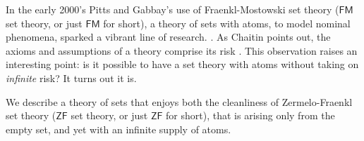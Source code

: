 \documentclass[12pt]{llncs}
\begin{document}
\lstset{language=[Objective]Caml,frame=shadowbox}




In the early 2000's Pitts and Gabbay's use of Fraenkl-Mostowski set
theory ($\mathsf{FM}$ set theory, or just $\mathsf{FM}$ for short), a
theory of sets with atoms, to model nominal phenomena, sparked a
vibrant line of research. \cite{DBLP:journals/fac/GabbayP02}
\cite{DBLP:journals/jcss/Clouston14}. As Chaitin points out, the
axioms and assumptions of a theory comprise its risk
\cite{chaitin1999unknowable}. This observation raises an interesting
point: is it possible to have a set theory with atoms without taking
on \emph{infinite} risk? It turns out it is.

We describe a theory of sets that enjoys both the cleanliness of
Zermelo-Fraenkl set theory ($\mathsf{ZF}$ set theory, or just
$\mathsf{ZF}$ for short), that is arising only from the empty set, and
yet with an infinite supply of atoms.













   

\end{document}
